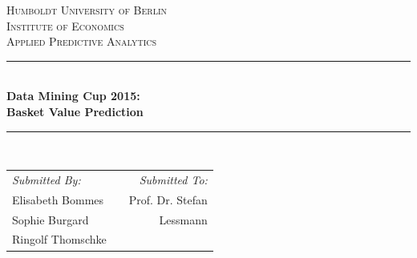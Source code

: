 \begin{titlepage}

\newcommand{\HRule}{\rule{\linewidth}{0.5mm}} %

\center %
 

\textsc{\LARGE Humboldt University of Berlin }\\[0.3cm] %
\textsc{\LARGE Institute of Economics  }\\[0.3cm]
\textsc{\Large Applied Predictive Analytics}\\[0.5cm] %


\HRule \\[0.4cm]
{ \huge \bfseries Data Mining Cup 2015:\\[0.5cm] Basket Value Prediction}\\[0.03cm] %
\HRule \\[1.5cm]

 


\begin{table}[H]
\begin{center}
\begin{tabular}{lcr}
\emph{Submitted By:} & & \emph{Submitted To:} \\
Elisabeth Bommes & & Prof. Dr. Stefan\\
Sophie Burgard &  & Lessmann\\
Ringolf Thomschke\\ %
\end{tabular}
\end{center}
\end{table}




\end{titlepage}
